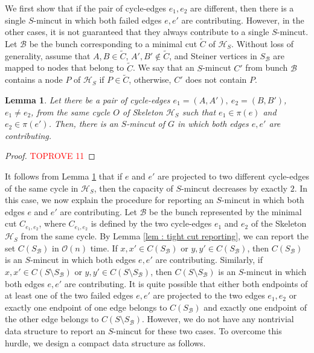 \documentclass[letterpaper,11pt]{article}
\newtheorem{lemma}{Lemma}[]
\begin{document}
We first show that if the pair of cycle-edges $e_1,e_2$ are different, then there is a single $S$-mincut in which both failed edges $e,e'$ are contributing.  
However, in the other cases, it is not guaranteed that they always contribute to a single $S$-mincut. Let ${\mathcal B}$ be the bunch corresponding to a minimal cut $\tilde C$ of ${\mathcal H}_S$. Without loss of generality, assume that $A,B\in \tilde C$, $A',B'\notin \tilde C$, and Steiner vertices in $S_{\mathcal B}$ are mapped to nodes that belong to $\tilde C$. We say that an $S$-mincut $C'$ from bunch ${\mathcal B}$ contains a node $P$ of ${\mathcal H}_S$ if $P\in \tilde C$, otherwise, $C'$ does not contain $P$.
\begin{lemma} \label{lem : different cycle edges}
    Let there be a pair of cycle-edges $e_1=(A,A'),~e_2=(B,B')$, $e_1\ne e_2$, from the same cycle $O$ of Skeleton ${\mathcal H}_S$ such that $e_1\in \pi(e)$ and $e_2\in \pi(e')$. Then, there is an $S$-mincut of $G$ in which both edges $e,e'$ are contributing. 
\end{lemma}
\begin{proof}\textcolor{red}{TOPROVE 11}\end{proof}
It follows from Lemma \ref{lem : different cycle edges} that if $e$ and $e'$ are projected to two different cycle-edges of the same cycle in ${\mathcal H}_S$, then the capacity of $S$-mincut decreases by exactly $2$. In this case, we now explain the procedure for reporting an $S$-mincut in which both edges $e$ and $e'$ are contributing. Let ${\mathcal B}$ be the bunch represented by the minimal cut $C_{e_1,e_2}$, where $C_{e_1,e_2}$ is defined by the two cycle-edges $e_1$ and $e_2$ of the Skeleton ${\mathcal H}_S$ from the same cycle. By Lemma \ref{lem : tight cut reporting}, we can report the set $C(S_{\mathcal B})$ in ${\mathcal O}(n)$ time. 
If $x,x'\in C(S_{\mathcal B})$ or $y,y'\in C(S_{\mathcal B})$, then $C(S_{\mathcal B})$ is an $S$-mincut in which both edges $e,e'$ are contributing. Similarly, if $x,x'\in C(S\setminus S_{\mathcal B})$ or $y,y'\in C(S\setminus S_{\mathcal B})$, then $C(S\setminus S_{\mathcal B})$ is an $S$-mincut in which both edges $e,e'$ are contributing.
It is quite possible that either both endpoints of at least one of the two failed edges $e,e'$ are projected to the two edges $e_1,e_2$ or exactly one endpoint of one edge belongs to $C(S_{\mathcal B})$ and exactly one endpoint of the other edge belongs to $C(S\setminus S_{\mathcal B})$.
However, we do not have any nontrivial data structure to report an $S$-mincut for these two cases. To overcome this hurdle, we design a compact data structure as follows.
\end{document}
